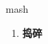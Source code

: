 
\begin{frame}
{\huge mash}
\begin{center}
\begin{enumerate}\Large
  \item \textbf{捣碎}
\end{enumerate}
\end{center}
\end{frame}
